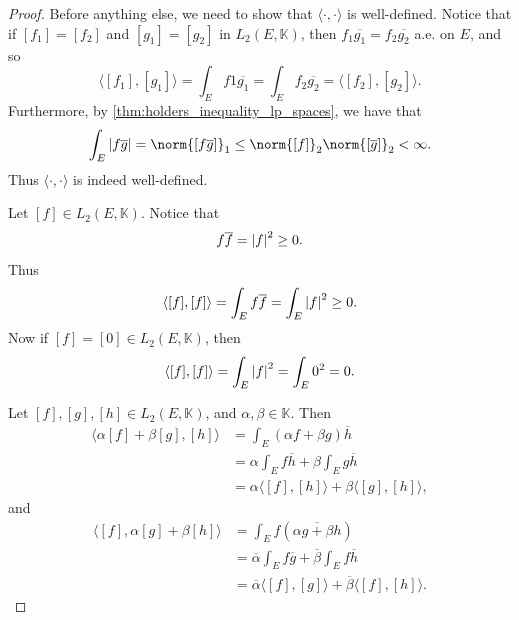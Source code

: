 \documentclass[notoc,notitlepage]{tufte-book}
\begin{document}
\begin{proof}
  Before anything else, we need to show that $\langle \cdot, \cdot \rangle$ 
  is well-defined.
  Notice that if $[f_1] = [f_2]$ and $[g_1] = [g_2]$
  in $L_2(E, \mathbb{K})$, then $f_1 \overline{g_1} = f_2 \overline{g_2}$ a.e.
  on $E$, and so
  \begin{equation*}
    \langle [f_1], [g_1] \rangle = \int_{E} f1 \overline{g_1}
    = \int_{E} f_2 \overline{g_2}
    = \langle [f_2], [g_2] \rangle.
  \end{equation*}
  Furthermore, by \cref{thm:holders_inequality_lp_spaces},
  we have that
  \begin{equation*}
    \int_{E} \abs{f \overline{g}} = \norm{[f \overline{g}]}_1 \leq \norm{[f]}_2
    \norm{[\overline{g}]}_2 < \infty.
  \end{equation*}
  Thus $\langle \cdot, \cdot \rangle$ is indeed well-defined.

  \noindent
   Let $[f] \in L_2(E, \mathbb{K})$.
  Notice that
  \begin{equation*}
    f \overline{f} = \left|f\right|^2 \geq 0.
  \end{equation*}
  Thus
  \begin{equation*}
    \langle [f], [f] \rangle = \int_{E} f \overline{f} = \int_{E} \left|f\right|^2 \geq 0.
  \end{equation*}
  Now if $[f] = [0] \in L_2(E, \mathbb{K})$, then
  \begin{equation*}
    \langle [f], [f] \rangle = \int_{E} \left|f\right|^2 = \int_{E} 0^2 = 0.
  \end{equation*}

  \noindent
   Let $[f], [g], [h] \in L_2(E, \mathbb{K})$,
  and $\alpha, \beta \in \mathbb{K}$. Then
  \begin{align*}
    \langle \alpha [f] + \beta [g], [h] \rangle
    &= \int_{E} (\alpha f + \beta g) \overline{h} \\
    &= \alpha \int_{E} f \overline{h} + \beta \int_{E} g \overline{h} \\
    &= \alpha \langle [f], [h] \rangle + \beta \langle [g], [h] \rangle,
  \end{align*}
  and
  \begin{align*}
    \langle [f], \alpha [g] + \beta [h] \rangle
    &= \int_{E} f (\overline{\alpha g + \beta h}) \\
    &= \overline{\alpha} \int_{E} f \overline{g}
      + \overline{\beta} \int_{E} f \overline{h} \\
    &= \overline{\alpha} \langle [f], [g] \rangle
      + \overline{\beta} \langle [f], [h] \rangle.
  \end{align*}


\end{proof}
\end{document}
